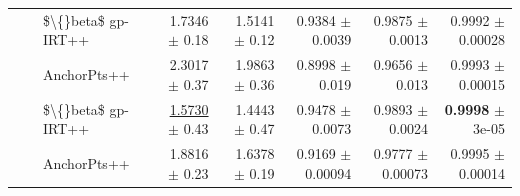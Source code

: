 \begin{longtable}{llp{}rrrrr}
 &  & \$\textbackslash\{\}beta\$ gp-IRT++ & 1.7346 {\scriptsize $\pm$ 0.18} & 1.5141 {\scriptsize $\pm$ 0.12} & 0.9384 {\scriptsize $\pm$ 0.0039} & 0.9875 {\scriptsize $\pm$ 0.0013} & 0.9992 {\scriptsize $\pm$ 0.00028} \\
 &  & AnchorPts++ & 2.3017 {\scriptsize $\pm$ 0.37} & 1.9863 {\scriptsize $\pm$ 0.36} & 0.8998 {\scriptsize $\pm$ 0.019} & 0.9656 {\scriptsize $\pm$ 0.013} & 0.9993 {\scriptsize $\pm$ 0.00015} \\
 &  & \$\textbackslash\{\}beta\$ gp-IRT++ & \underline{1.5730} {\scriptsize $\pm$ 0.43} & 1.4443 {\scriptsize $\pm$ 0.47} & 0.9478 {\scriptsize $\pm$ 0.0073} & 0.9893 {\scriptsize $\pm$ 0.0024} & \textbf{0.9998} {\scriptsize $\pm$ 3e-05} \\
 &  & AnchorPts++ & 1.8816 {\scriptsize $\pm$ 0.23} & 1.6378 {\scriptsize $\pm$ 0.19} & 0.9169 {\scriptsize $\pm$ 0.00094} & 0.9777 {\scriptsize $\pm$ 0.00073} & 0.9995 {\scriptsize $\pm$ 0.00014} \\
\end{longtable}
